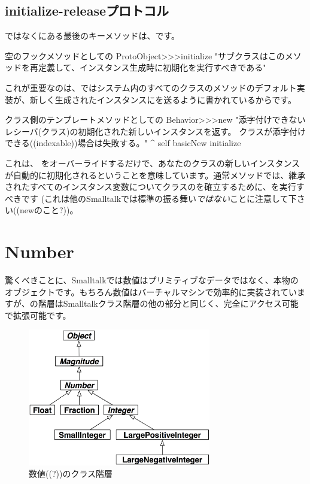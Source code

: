 \documentclass[a4paper,10pt,twoside]{book}
\begin{document}
\subsection{initialize-releaseプロトコル}

ではなくにある最後のキーメソッドは、です。

\begin{method}{空のフックメソッドとしての}
ProtoObject>>>initialize
   "サブクラスはこのメソッドを再定義して、インスタンス生成時に初期化を実行すべきである"
\end{method}

これが重要なのは、\pharo ではシステム内のすべてのクラスのメソッドのデフォルト実装が、新しく生成されたインスタンスにを送るように書かれているからです。

\begin{method}{クラス側のテンプレートメソッドとしての}
Behavior>>>new
    "添字付けできないレシーバ(クラス)の初期化された新しいインスタンスを返す。
    クラスが添字付けできる((indexable))場合は失敗する。"
    ^ self basicNew initialize
\end{method}

これは、 をオーバーライドするだけで、あなたのクラスの新しいインスタンスが自動的に初期化されるということを意味しています。通常メソッドでは、継承されたすべてのインスタンス変数についてクラスのを確立するために、を実行すべきです
(これは他のSmalltalkでは標準の振る舞い\emph{ではない}ことに注意して下さい((newのこと?))。

\section{Number}
驚くべきことに、Smalltalkでは数値はプリミティブなデータではなく、本物のオブジェクトです。もちろん数値はバーチャルマシンで効率的に実装されていますが、の階層はSmalltalkクラス階層の他の部分と同じく、完全にアクセス可能で拡張可能です。

\begin{figure}[ht]
\centerline {\includegraphics[width=8cm]{NumberHierarchy}}
\caption{数値((?))のクラス階層 }
\end{figure}
\end{document}
